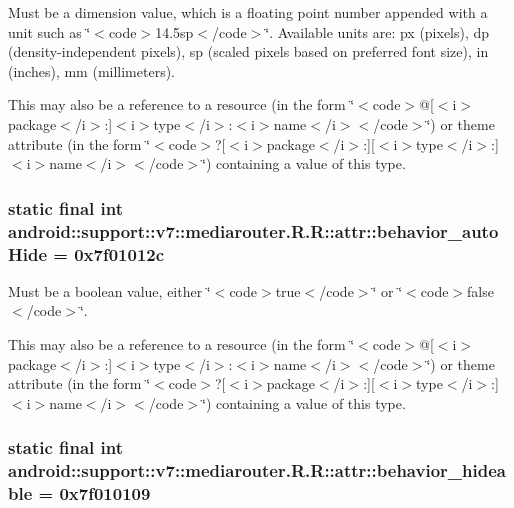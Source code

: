 Must be a dimension value, which is a floating point number appended with a unit such as \char`\"{}$<$code$>$14.5sp$<$/code$>$\char`\"{}. Available units are: px (pixels), dp (density-independent pixels), sp (scaled pixels based on preferred font size), in (inches), mm (millimeters). 

This may also be a reference to a resource (in the form \char`\"{}$<$code$>$@\mbox{[}$<$i$>$package$<$/i$>$:\mbox{]}$<$i$>$type$<$/i$>$:$<$i$>$name$<$/i$>$$<$/code$>$\char`\"{}) or theme attribute (in the form \char`\"{}$<$code$>$?\mbox{[}$<$i$>$package$<$/i$>$:\mbox{]}\mbox{[}$<$i$>$type$<$/i$>$:\mbox{]}$<$i$>$name$<$/i$>$$<$/code$>$\char`\"{}) containing a value of this type. \hypertarget{classandroid_1_1support_1_1v7_1_1mediarouter_1_1_r_1_1attr_9c859fd8969843ce451a62e6d5ae5799}{
\subsubsection[{behavior\_\-autoHide}]{\setlength{\rightskip}{0pt plus 5cm}static final int android::support::v7::mediarouter.R.R::attr::behavior\_\-autoHide = 0x7f01012c}}
\label{classandroid_1_1support_1_1v7_1_1mediarouter_1_1_r_1_1attr_9c859fd8969843ce451a62e6d5ae5799}


Must be a boolean value, either \char`\"{}$<$code$>$true$<$/code$>$\char`\"{} or \char`\"{}$<$code$>$false$<$/code$>$\char`\"{}. 

This may also be a reference to a resource (in the form \char`\"{}$<$code$>$@\mbox{[}$<$i$>$package$<$/i$>$:\mbox{]}$<$i$>$type$<$/i$>$:$<$i$>$name$<$/i$>$$<$/code$>$\char`\"{}) or theme attribute (in the form \char`\"{}$<$code$>$?\mbox{[}$<$i$>$package$<$/i$>$:\mbox{]}\mbox{[}$<$i$>$type$<$/i$>$:\mbox{]}$<$i$>$name$<$/i$>$$<$/code$>$\char`\"{}) containing a value of this type. \hypertarget{classandroid_1_1support_1_1v7_1_1mediarouter_1_1_r_1_1attr_ddb23391027462a840c8037a491ac14e}{
\subsubsection[{behavior\_\-hideable}]{\setlength{\rightskip}{0pt plus 5cm}static final int android::support::v7::mediarouter.R.R::attr::behavior\_\-hideable = 0x7f010109}}
\label{classandroid_1_1support_1_1v7_1_1mediarouter_1_1_r_1_1attr_ddb23391027462a840c8037a491ac14e}


